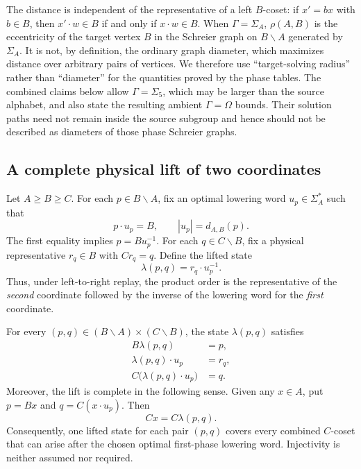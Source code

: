 The distance is independent of the representative of a left $B$-coset: if
$x'=bx$ with $b\in B$, then $x'\mathbin{\cdot}w\in B$ if and only if
$x\mathbin{\cdot}w\in B$.  When $\Gamma=\Sigma_A$, $\rho(A,B)$ is the
eccentricity of the target vertex $B$ in the Schreier graph on
$B\backslash A$ generated by $\Sigma_A$.  It is not, by definition, the
ordinary graph diameter, which maximizes distance over arbitrary pairs of
vertices.  We therefore use ``target-solving radius'' rather than
``diameter'' for the quantities proved by the phase tables.  The combined
claims below allow $\Gamma=\Sigma_5$, which may be larger than the source
alphabet, and also state the resulting ambient $\Gamma=\Omega$ bounds.  Their
solution paths need not remain inside the source subgroup and hence should not
be described as diameters of those phase Schreier graphs.

\subsection{A complete physical lift of two coordinates}
\label{sec:physical-lift}

Let $A\geq B\geq C$.  For each $p\in B\backslash A$, fix an optimal lowering
word $u_p\in\Sigma_A^*$ such that
\[
  p\mathbin{\cdot}u_p=B,
  \qquad |u_p|=d_{A,B}(p).
\]
The first equality implies $p=B u_p^{-1}$.  For each
$q\in C\backslash B$, fix a physical representative $r_q\in B$ with
$Cr_q=q$.  Define the lifted state
\begin{equation}
  \lambda(p,q)=r_q\mathbin{\cdot}u_p^{-1}.
  \label{eq:physical-lift}
\end{equation}
Thus, under left-to-right replay, the product order is the representative of
the \emph{second} coordinate followed by the inverse of the lowering word for
the \emph{first} coordinate.

\begin{lemma}
\label{lem:maximal-lifting}
For every $(p,q)\in(B\backslash A)\times(C\backslash B)$, the state
$\lambda(p,q)$ satisfies
\begin{align}
  B\lambda(p,q)&=p,
  \label{eq:lift-first-coordinate}\\
  \lambda(p,q)\mathbin{\cdot}u_p&=r_q,
  \label{eq:lift-intermediate}\\
  C\bigl(\lambda(p,q)\mathbin{\cdot}u_p\bigr)&=q.
  \label{eq:lift-second-coordinate}
\end{align}
Moreover, the lift is complete in the following sense.  Given any $x\in A$,
put $p=Bx$ and $q=C(x\mathbin{\cdot}u_p)$.  Then
\begin{equation}
  Cx=C\lambda(p,q).
  \label{eq:lift-completeness}
\end{equation}
Consequently, one lifted state for each pair $(p,q)$ covers every combined
$C$-coset that can arise after the chosen optimal first-phase lowering word.
Injectivity is neither assumed nor required.
\end{lemma}

